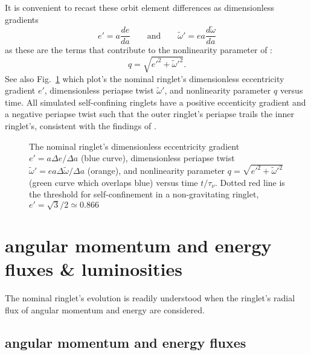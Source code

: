 \documentclass[preprint]{aastex62}
\begin{document}
It is convenient to recast these orbit element differences as dimensionless gradients
\begin{equation}
    \label{eqn:e_prime}
    e' = a\frac{de}{da}
    \qquad\mbox{and}\qquad
    \tilde{\omega}' = ea\frac{d\tilde{\omega}}{da}
\end{equation}
as these are the terms that contribute to the nonlinearity parameter of \cite{BGT83}:
\begin{equation}
    \label{eqn:q}
    q = \sqrt{e'^2 + \tilde{\omega}'^2}.
\end{equation}
See also Fig.\ \ref{fig:de_prime_nominal} which plot's the nominal
ringlet's dimensionless eccentricity gradient $e'$, dimensionless periapse twist $\tilde{\omega}'$,
and nonlinearity parameter $q$ versus time. All simulated self-confining ringlets
have a positive eccenticity gradient and a negative periapse twist such that
the outer ringlet's periapse trails the inner ringlet's, consistent with the findings of
\cite{BGT83}.\vfil

\begin{figure}
    \caption{
        \label{fig:de_prime_nominal}
        The nominal ringlet's dimensionless eccentricity gradient $e' = a\Delta e/\Delta a$
        (blue curve), dimensionless periapse twist $\tilde{\omega}' = ea\Delta\tilde{\omega}/\Delta a$
        (orange), and nonlinearity parameter $q=\sqrt{e'^2 + \tilde{\omega}'^2}$
        (green curve which overlaps blue) versus time $t/\tau_\nu$. Dotted red line 
        is the threshold for self-confinement in a non-gravitating ringlet, $e'=\sqrt{3}/2\simeq0.866$
    }
\end{figure}\vfil


\section{angular momentum and energy fluxes \& luminosities}
\label{sec:fluxes}

The nominal ringlet's evolution is readily understood when the ringlet's 
radial flux of angular momentum and energy are considered. 

\subsection{angular momentum and energy fluxes}
\label{subsec:fluxes}
\end{document}
